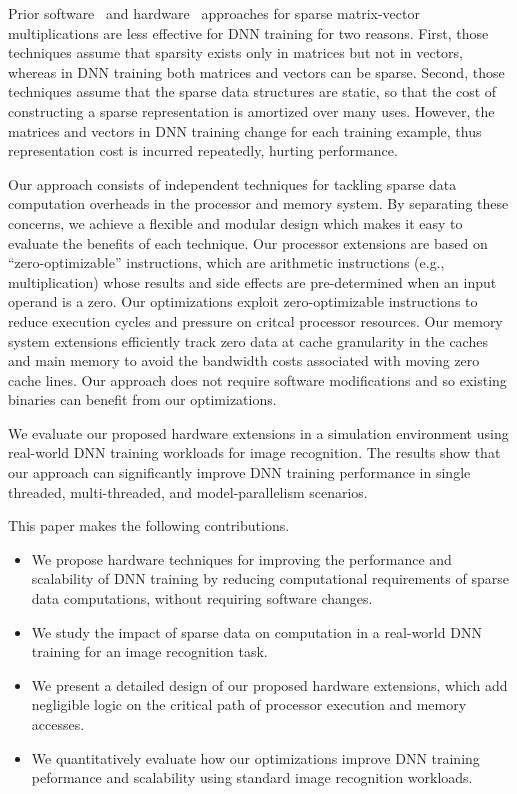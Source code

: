 Prior software~\cite{Eisenstat82, IntelSparseMatrix} and hardware~\cite{Carter99, Srinidhi12, Fowers13} approaches for sparse matrix-vector multiplications are less effective for DNN training for two reasons.  First, those techniques assume that sparsity exists only in matrices but not in vectors, whereas in DNN training both matrices and vectors can be sparse.  Second, those techniques assume that the sparse data structures are static, so that the cost of constructing a sparse representation is amortized over many uses.  However, the matrices and vectors in DNN training change for each training example, thus representation cost is incurred repeatedly, hurting performance. 

Our approach consists of independent techniques for tackling sparse data computation overheads in the processor and memory system.  By separating these concerns, we achieve a flexible and modular design which makes it easy to evaluate the benefits of each technique.  Our processor extensions are based on ``zero-optimizable'' instructions, which are arithmetic instructions (e.g., multiplication) whose results and side effects are pre-determined when an input operand is a zero. Our optimizations exploit zero-optimizable instructions to reduce execution cycles and pressure on critcal processor resources.  Our memory system extensions efficiently track zero data at cache granularity in the caches and main memory to avoid the bandwidth costs associated with moving zero cache lines. Our approach does not require software modifications and so existing binaries can benefit from our optimizations. 

We evaluate our proposed hardware extensions in a simulation environment using real-world DNN training workloads for image recognition. The results show that our approach can significantly improve DNN training performance in single threaded, multi-threaded, and model-parallelism scenarios.

This paper makes the following contributions.
\begin{itemize}

\item We propose hardware techniques for improving the performance and scalability of DNN training by reducing computational requirements of sparse data computations, without requiring software changes. 
\item We study the impact of sparse data on computation in a real-world DNN training for an image recognition task. 
\item We present a detailed design of our proposed hardware extensions, which add negligible logic on the critical path of processor execution and memory accesses. 
\item We quantitatively evaluate how our optimizations improve DNN training peformance and scalability using standard image recognition workloads. 

\end{itemize}

